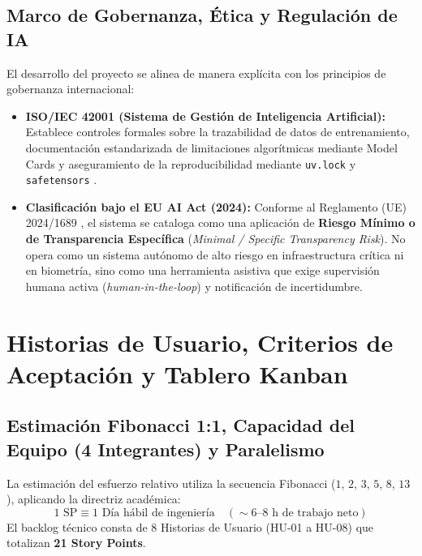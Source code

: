 \documentclass[12pt,letterpaper]{article}
\begin{document}
\subsection{Marco de Gobernanza, Ética y Regulación de IA}
El desarrollo del proyecto se alinea de manera explícita con los principios de gobernanza internacional:
\begin{itemize}[leftmargin=*]
    \item \textbf{ISO/IEC 42001 (Sistema de Gestión de Inteligencia Artificial):} Establece controles formales sobre la trazabilidad de datos de entrenamiento, documentación estandarizada de limitaciones algorítmicas mediante Model Cards y aseguramiento de la reproducibilidad mediante \texttt{uv.lock} y \texttt{safetensors} \cite{iso42001}.
    \item \textbf{Clasificación bajo el EU AI Act (2024):} Conforme al Reglamento (UE) 2024/1689 \cite{eu_ai_act_2024}, el sistema se cataloga como una aplicación de \textbf{Riesgo Mínimo o de Transparencia Específica} (\textit{Minimal / Specific Transparency Risk}). No opera como un sistema autónomo de alto riesgo en infraestructura crítica ni en biometría, sino como una herramienta asistiva que exige supervisión humana activa (\textit{human-in-the-loop}) y notificación de incertidumbre.
\end{itemize}

\FloatBarrier
\section{Historias de Usuario, Criterios de Aceptación y Tablero Kanban}

\subsection{Estimación Fibonacci 1:1, Capacidad del Equipo (4 Integrantes) y Paralelismo}
La estimación del esfuerzo relativo utiliza la secuencia Fibonacci ($1$, $2$, $3$, $5$, $8$, $13$), aplicando la directriz académica:
\begin{equation}
1 \text{ SP} \equiv 1 \text{ Día hábil de ingeniería} \quad (\sim 6\text{--}8 \text{ h de trabajo neto})
\end{equation}
El backlog técnico consta de 8 Historias de Usuario (HU-01 a HU-08) que totalizan \textbf{21 Story Points}. 
\end{document}
